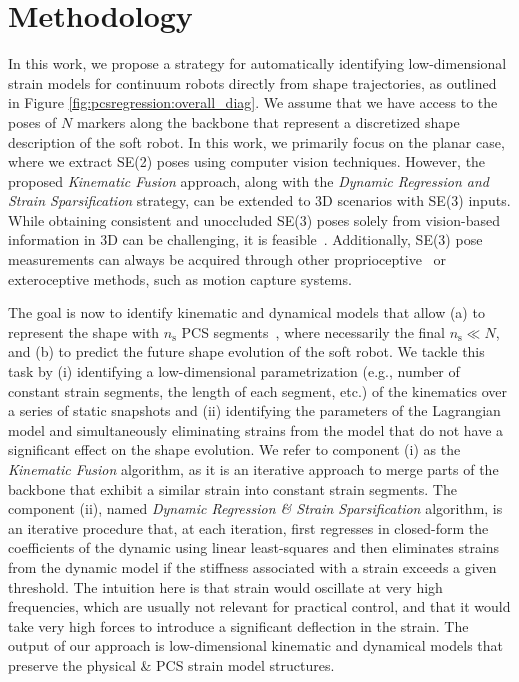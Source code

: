 \section{Methodology}\label{sec:pcsregression:methodology}
In this work, we propose a strategy for automatically identifying low-dimensional strain models for continuum robots directly from shape trajectories, as outlined in Figure \ref{fig:pcsregression:overall_diag}.
We assume that we have access to the poses of $N$ markers along the backbone that represent a discretized shape description of the soft robot.
In this work, we primarily focus on the planar case, where we extract SE(2) poses using computer vision techniques. However, the proposed \emph{Kinematic Fusion} approach, along with the \emph{Dynamic Regression and Strain Sparsification} strategy, can be extended to 3D scenarios with SE(3) inputs. While obtaining consistent and unoccluded SE(3) poses solely from vision-based information in 3D can be challenging, it is feasible~\citep{zheng2024vision}. Additionally, SE(3) pose measurements can always be acquired through other proprioceptive~\citep{rosi2022sensing} or exteroceptive methods, such as motion capture systems.

The goal is now to identify kinematic and dynamical models that allow (a) to represent the shape with 
$n_\mathrm{s}$ \gls{PCS} segments~\citep{renda2018discrete}, where necessarily the final $n_\mathrm{s} \ll N$, and (b) to predict the future shape evolution of the soft robot.
We tackle this task by (i) identifying a low-dimensional parametrization (e.g., number of constant strain segments, the length of each segment, etc.) of the kinematics over a series of static snapshots and (ii) identifying the parameters of the Lagrangian model and simultaneously eliminating strains from the model that do not have a significant effect on the shape evolution.
We refer to component (i) as the \emph{Kinematic Fusion} algorithm, as it is an iterative approach to merge parts of the backbone that exhibit a similar strain into constant strain segments.
The component (ii), named \emph{Dynamic Regression \& Strain Sparsification} algorithm, is an iterative procedure that, at each iteration, first regresses in closed-form the coefficients of the dynamic using linear least-squares and then eliminates strains from the dynamic model if the stiffness associated with a strain exceeds a given threshold. The intuition here is that strain would oscillate at very high frequencies, which are usually not relevant for practical control, and that it would take very high forces to introduce a significant deflection in the strain.
The output of our approach is low-dimensional kinematic and dynamical models that preserve the physical \& \gls{PCS} strain model structures.

